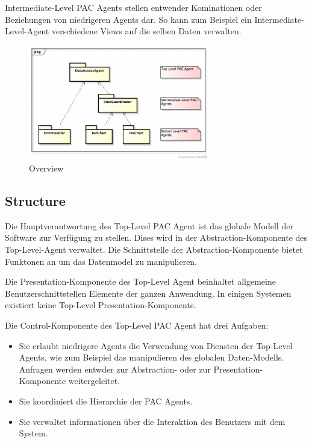 Intermediate-Level PAC Agents stellen entwender Kominationen oder Beziehungen von niedrigeren Agents dar. So kann zum Beispiel ein Intermediate-Level-Agent verschiedene Views auf die selben Daten verwalten.

\begin{figure}[H]
	\centering
	\includegraphics[width=0.7\textwidth]{content/posa1/images/presentation-abstraction-control-overview.png}
	\caption{Overview}
\end{figure}


\subsection*{Structure}


Die Hauptverantwortung des Top-Level PAC Agent ist das globale Modell der Software zur Verfügung zu stellen. Dises wird in der Abstraction-Komponente des Top-Level-Agent verwaltet. Die Schnittstelle der Abstraction-Komponente bietet Funktonen an um das Datenmodel zu manipulieren.

Die Presentation-Komponente des Top-Level Agent beinhaltet allgemeine Benutzerschnittstellen Elemente der ganzen Anwendung. In einigen Systemen existiert keine Top-Level Presentation-Komponente.

Die Control-Komponente des Top-Level PAC Agent hat drei Aufgaben:

\begin{itemize}
	\item Sie erlaubt niedrigere Agents die Verwendung von Diensten der Top-Level Agents, wie zum Beispiel das manipulieren des globalen Daten-Modells. Anfragen werden entwder zur Abstraction- oder zur Presentation-Komponente weitergeleitet.
	\item Sie koordiniert die Hierarchie der PAC Agents.
	\item Sie verwaltet informationen über die Interaktion des Benutzers mit dem System.
\end{itemize}

